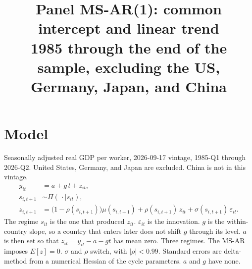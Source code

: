\documentclass[11pt]{article}
\title{Panel MS-AR(1): common intercept and linear trend\\[0.4em]\large 1985 through the end of the sample, excluding the US, Germany, Japan, and China}
\author{}
\date{}
\begin{document}
\maketitle
\section{Model}
Seasonally adjusted real GDP per worker, 2026-09-17 vintage, 1985-Q1 through 2026-Q2. United States, Germany, and Japan are excluded. China is not in this vintage.
\begin{align}
y_{it} &= a + g\, t + z_{it}, \\
s_{i,t+1} &\sim \Pi(\,\cdot\mid s_{it}), \\
z_{i,t+1} &= \bigl(1-\rho(s_{i,t+1})\bigr)\mu(s_{i,t+1}) + \rho(s_{i,t+1})\, z_{it} + \sigma(s_{i,t+1})\,\varepsilon_{it}.
\end{align}
The regime $s_{it}$ is the one that produced $z_{it}$. $\varepsilon_{it}$ is the innovation. $g$ is the within-country slope, so a country that enters later does not shift $g$ through its level. $a$ is then set so that $z_{it}=y_{it}-a-gt$ has mean zero. Three regimes. The MS-AR imposes $E[z]=0$. $\sigma$ and $\rho$ switch, with $|\rho|<0.99$. Standard errors are delta-method from a numerical Hessian of the cycle parameters. $a$ and $g$ have none.
\clearpage
\end{document}
